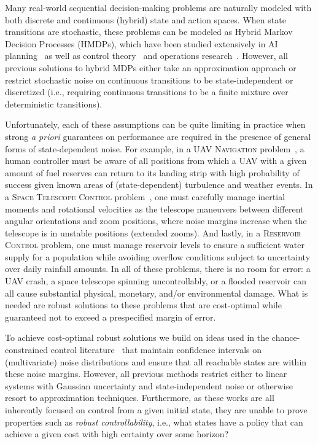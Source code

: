 
Many real-world sequential decision-making problems are naturally
modeled with both discrete and continuous (hybrid) state and action
spaces.  When state transitions are stochastic, these problems can be
modeled as Hybrid Markov Decision Processes (HMDPs), which have been
studied extensively in AI
planning~\cite{boyan01,feng04,li05,kveton06,phase07,hao09,sdp_aaai}
as well as control theory~\cite{Henzinger:1997,Hu:2000,DeSHee:2009}
and operations research~\cite{puterman}.  However, all previous
solutions to hybrid MDPs either take an approximation approach or
restrict stochastic noise on continuous transitions to be
state-independent or discretized (i.e., requiring continuous
transitions to be a finite mixture over deterministic transitions).

Unfortunately, each of these assumptions can be quite limiting in
practice when strong \emph{a priori} guarantees on performance are
required in the presence of general forms of state-dependent noise.
For example, in a \textsc{UAV Navigation} problem~\cite{Blackmore:2011}, a human
controller must be aware of all positions from which a UAV with a
given amount of fuel reserves can return to its landing strip with
high probability of success given known areas of (state-dependent)
turbulence and weather events.  In a \textsc{Space Telescope Control}
problem~\cite{DLohr:2012}, one must carefully manage inertial moments and
rotational velocities as the telescope maneuvers between different
angular orientations and zoom positions, where noise margins increase
when the telescope is in unstable positions (extended zooms).  And
lastly, in a \textsc{Reservoir Control} problem, one must manage
reservoir levels to ensure a sufficient water supply for a population
while avoiding overflow conditions subject to uncertainty over daily
rainfall amounts.  In all of these problems, there is no room for
error: a UAV crash, a space telescope spinning uncontrollably, or a
flooded reservoir can all cause substantial physical, monetary, and/or
environmental damage.  What is needed are robust solutions to these
problems that are cost-optimal while guaranteed not to exceed a
prespecified margin of error.

To achieve cost-optimal robust solutions we build on ideas
used in the chance-constrained control
literature~\cite{Schwarm:1999,Li:2002,Ono:2008,Blackmore:2011} that
maintain confidence intervals on (multivariate) noise distributions
and ensure that all reachable states are within these noise margins.
However, all previous methods restrict either to linear systems with
Gaussian uncertainty and state-independent noise or otherwise resort
to approximation techniques.  Furthermore, as these works are all
inherently focused on control from a given initial state, they are
unable to prove properties such as \emph{robust controllability},
i.e., what states have a policy that can achieve a given cost with
high certainty over some horizon?

